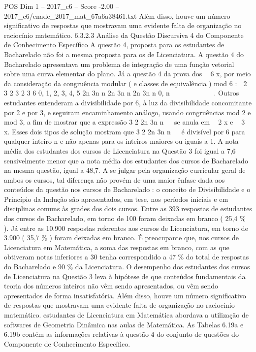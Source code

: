 \begin{textsample}{POS Dim 1 – 2017\_c6 – Score -2.00 – 2017\_c6/enade\_2017\_mat\_67a6a38461.txt}
Além disso, houve um número significativo de respostas que mostravam uma evidente falta de organização no raciocínio matemático. 6.3.2.3 Análise da Questão Discursiva 4 do Componente de Conhecimento Específico A questão 4, proposta para os estudantes de Bacharelado não foi a mesma proposta para os de Licenciatura.
A questão 4 do Bacharelado apresentava um problema de integração de uma função vetorial sobre uma curva elementar do plano.
Já a questão 4 da prova dos  6 x, por meio da consideração da congruência modular ( e classes de equivalência ) mod 6 :  2 3 2 3 2 3 6 0, 1, 2, 3, 4, 5 2n 3n n 2n 3n n 2n 3n n 0, n          .
Outros estudantes entenderam a divisibilidade por 6, à luz da divisibilidade concomitante por 2 e por 3, e seguiram encaminhamento análogo, usando congruências mod 2 e mod 3, a fim de mostrar que a expressão 3 2 2n 3n n   se anula em  2 x e  3 x.
Esses dois tipos de solução mostram que 3 2 2n 3n n   é divisível por 6 para qualquer inteiro n e não apenas para os inteiros maiores ou iguais a 1.
A nota média dos estudantes dos cursos de Licenciatura na Questão 3 foi igual a 7,6 sensivelmente menor que a nota média dos estudantes dos cursos de Bacharelado na mesma questão, igual a 48,7.
A se julgar pela organização curricular geral de ambos os cursos, tal diferença não provém de uma maior ênfase dada aos conteúdos da questão nos cursos de Bacharelado : o conceito de Divisibilidade e o Princípio da Indução são apresentados, em tese, nos períodos iniciais e em disciplinas comuns às grades dos dois cursos.
Entre as 393 respostas de estudantes dos cursos de Bacharelado, em torno de 100 foram deixadas em branco ( 25,4 \% ).
Já entre as 10.900 respostas referentes aos cursos de Licenciatura, em torno de 3.900 ( 35,7 \% ) foram deixadas em branco.
É preocupante que, nos cursos de Licenciatura em Matemática, a soma das respostas em branco, com as que obtiveram notas inferiores a 30 tenha correspondido a 47 \% do total de respostas do Bacharelado e 90 \% da Licenciatura.
O desempenho dos estudantes dos cursos de Licenciatura na Questão 3 leva à hipótese de que conteúdos fundamentais da teoria dos números inteiros não vêm sendo apresentados, ou vêm sendo apresentados de forma insatisfatória.
Além disso, houve um número significativo de respostas que mostravam uma evidente falta de organização no raciocínio matemático. estudantes de Licenciatura em Matemática abordava a utilização de softwares de Geometria Dinâmica nas aulas de Matemática.
As Tabelas 6.19a e 6.19b contém as informações relativas à questão 4 do conjunto de questões do Componente de Conhecimento Específico.

\end{textsample}
